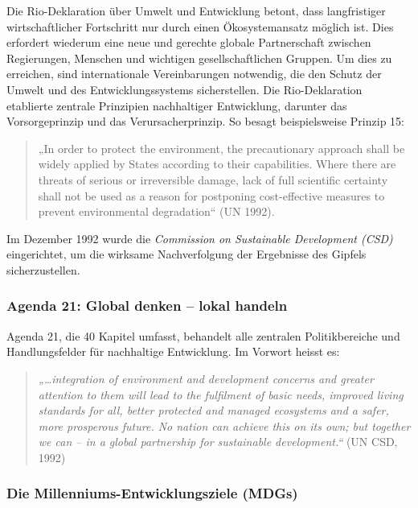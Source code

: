 \documentclass[
  letterpaper,
  DIV=11,
  numbers=noendperiod]{scrartcl}
\begin{document}
Die Rio-Deklaration über Umwelt und Entwicklung betont, dass
langfristiger wirtschaftlicher Fortschritt nur durch einen
Ökosystemansatz möglich ist. Dies erfordert wiederum eine neue und
gerechte globale Partnerschaft zwischen Regierungen, Menschen und
wichtigen gesellschaftlichen Gruppen. Um dies zu erreichen, sind
internationale Vereinbarungen notwendig, die den Schutz der Umwelt und
des Entwicklungssystems sicherstellen. Die Rio-Deklaration etablierte
zentrale Prinzipien nachhaltiger Entwicklung, darunter das
Vorsorgeprinzip und das Verursacherprinzip. So besagt beispielsweise
Prinzip 15:

\begin{quote}
„In order to protect the environment, the precautionary approach shall
be widely applied by States according to their capabilities. Where there
are threats of serious or irreversible damage, lack of full scientific
certainty shall not be used as a reason for postponing cost-effective
measures to prevent environmental degradation`` (UN 1992).
\end{quote}

Im Dezember 1992 wurde die \emph{Commission on Sustainable Development
(CSD)} eingerichtet, um die wirksame Nachverfolgung der Ergebnisse des
Gipfels sicherzustellen.

\subsubsection{Agenda 21: Global denken -- lokal
handeln}\label{agenda-21-global-denken-lokal-handeln}

Agenda 21, die 40 Kapitel umfasst, behandelt alle zentralen
Politikbereiche und Handlungsfelder für nachhaltige Entwicklung. Im
Vorwort heisst es:

\begin{quote}
\emph{„\ldots integration of environment and development concerns and
greater attention to them will lead to the fulfilment of basic needs,
improved living standards for all, better protected and managed
ecosystems and a safer, more prosperous future. No nation can achieve
this on its own; but together we can -- in a global partnership for
sustainable development.``} (UN CSD, 1992)
\end{quote}

\subsubsection{Die Millenniums-Entwicklungsziele
(MDGs)}\label{die-millenniums-entwicklungsziele-mdgs}
\end{document}
